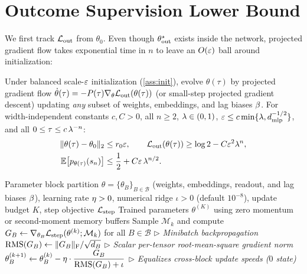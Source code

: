 \section{Outcome Supervision Lower Bound}
\label{sec:credit}
\label{sec:reach}
\label{sec:credit-results}

We first track $\mathcal L_{\mathrm{out}}$ from $\theta_0$. Even though $\theta^\star_{\mathrm{out}}$ exists inside the network, projected gradient flow takes exponential time in $n$ to leave an $O(\varepsilon)$ ball around initialization:

\begin{theorem}
\label{thm:outcome-end}
Under balanced scale-$\varepsilon$ initialization (\cref{ass:init}), evolve $\theta(\tau)$ by projected gradient flow $\dot\theta(\tau) = -P(\tau)\nabla_\theta\mathcal L_{\mathrm{out}}(\theta(\tau))$ (or small-step projected gradient descent) updating \emph{any} subset of weights, embeddings, and lag biases $\beta$. For width-independent constants $c, C > 0$, all $n \ge 2$, $\lambda \in (0,1)$, $\varepsilon \le c\min\{\lambda, d_{\mathrm{mlp}}^{-1/2}\}$, and all $0 \le \tau \le c\,\lambda^{-n}$:
\begin{align*}
  \|\theta(\tau) - \theta_0\|_2 &\le r_0\varepsilon, \qquad
  \mathcal L_{\mathrm{out}}(\theta(\tau)) \ge \log 2 - C\varepsilon^2\lambda^n,\\
  \mathbb E\bigl[p_{\theta(\tau)}(s_n)\bigr] &\le \frac{1}{2} + C\varepsilon\,\lambda^{n/2}.
\end{align*}
\end{theorem}

\begin{algorithm*}[t]
\caption{\textsc{Stateless Block-RMS SGD} (Zero-State Block-Scale Normalization)}
\label{alg:block-rms}
\begin{algorithmic}[1]
\REQUIRE Parameter block partition $\theta = \{\theta_B\}_{B \in \mathcal B}$ (weights, embeddings, readout, and lag biases $\beta$), learning rate $\eta > 0$, numerical ridge $\iota > 0$ (default $10^{-8}$), update budget $K$, step objective $\mathcal L_{\mathrm{step}}$
\ENSURE Trained parameters $\theta^{(K)}$ using zero momentum or second-moment memory buffers
  \STATE Sample $\mathcal M_k$ and compute $G_B \leftarrow \nabla_{\theta_B}\mathcal L_{\mathrm{step}}(\theta^{(k)}; \mathcal M_k)$ for all $B \in \mathcal B$ \hfill\textcolor{black!60}{$\triangleright$ \textit{Minibatch backpropagation}}
    \STATE $\mathrm{RMS}(G_B) \leftarrow \|G_B\|_{\mathrm{F}} / \sqrt{d_B}$ \hfill\textcolor{black!60}{$\triangleright$ \textit{Scalar per-tensor root-mean-square gradient norm}}
    \STATE $\theta_B^{(k+1)} \leftarrow \theta_B^{(k)} - \eta \cdot \dfrac{G_B}{\mathrm{RMS}(G_B) + \iota}$ \hfill\textcolor{black!60}{$\triangleright$ \textit{Equalizes cross-block update speeds ($0$ state)}}
  \ENDFOR
\ENDFOR
\end{algorithmic}
\end{algorithm*}

